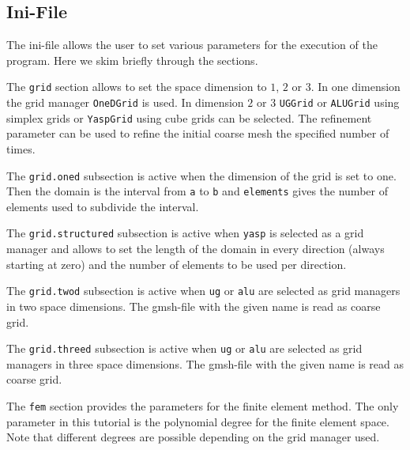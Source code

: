 \documentclass[a4paper,12pt]{article}
\begin{document}
\subsection{Ini-File}

The ini-file allows the user to set various parameters for the
execution of the program. Here we skim briefly through the sections.


The \lstinline{grid} section allows to set the space dimension to $1$, $2$ or $3$.
In one dimension the grid manager \lstinline{OneDGrid} is used.
In dimension $2$ or $3$ \lstinline{UGGrid} or \lstinline{ALUGrid} 
using simplex grids or \lstinline{YaspGrid} using cube grids can be selected.
The refinement parameter can be used to refine the initial coarse
mesh the specified number of times.


The \lstinline{grid.oned} subsection is active when the dimension
of the grid is set to one. Then the domain is the interval from \lstinline{a}
to \lstinline{b} and \lstinline{elements} gives the number of elements
used to subdivide the interval.


The \lstinline{grid.structured} subsection is active when \lstinline{yasp}
is selected as a grid manager and allows to set the length of the domain
in every direction (always starting at zero) and the number of elements
to be used per direction. 


The \lstinline{grid.twod} subsection is active when \lstinline{ug}
or \lstinline{alu} are selected as grid managers in two space dimensions.
The gmsh-file with the given name is read as coarse grid.


The \lstinline{grid.threed} subsection is active when \lstinline{ug}
or \lstinline{alu} are selected as grid managers in three space dimensions.
The gmsh-file with the given name is read as coarse grid.


The \lstinline{fem} section provides the parameters for the finite
element method. The only parameter in this tutorial is the polynomial
degree for the finite element space. Note that different degrees
are possible depending on the grid manager used.
\end{document}
